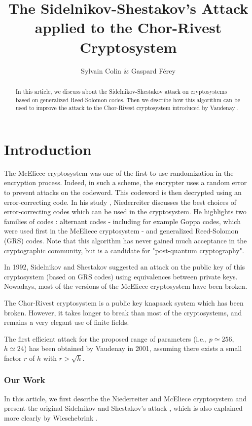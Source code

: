 \documentclass[a4paper]{article}
\author{Sylvain Colin \& Gaspard Férey}
\title{The Sidelnikov-Shestakov's Attack applied to the Chor-Rivest Cryptosystem}
\begin{document}
\maketitle

\begin{abstract}
In this article, we discuss about the Sidelnikov-Shestakov attack \cite{SidelShes92} on cryptosystems based on generalized Reed-Solomon codes. Then we describe how this algorithm can be used to improve the attack to the Chor-Rivest cryptosystem introduced by Vaudenay \cite{Vau01}.
\end{abstract}

\section{Introduction}
\label{sec:intro}

The McEliece cryptosystem \cite{NiederH86} was one of the first to use randomization in the encryption process. Indeed, in such a scheme, the encrypter uses a random error to prevent attacks on the codeword. This codeword is then decrypted using an error-correcting code. 
In his study \cite{NiederH86}, Niederreiter discusses the best choices of error-correcting codes which can be used in the cryptosystem. He highlights two families of codes : alternant codes
 - including for example Goppa codes, which were used first in the McEliece cryptosystem - and generalized Reed-Solomon (GRS) codes.
Note that this algorithm has never gained much acceptance in the cryptographic community, but is a candidate for "post-quantum cryptography".

In 1992, Sidelnikov and Shestakov suggested an attack \cite{SidelShes92} on the public key of this cryptosystem (based on GRS codes) using equivalences between private keys.
Nowadays, most of the versions of the McEliece cryptosystem have been broken.

The Chor-Rivest cryptosystem \cite{ChorRiv88} is a public key knapsack system which has been broken.  However, it takes longer to break than most of the cryptosystems, and remains a very elegant use of finite fields.

The first efficient attack for the proposed range of parameters (i.e., $p \simeq 256$, $h \simeq 24$) has been obtained by Vaudenay in 2001, assuming there exists a small factor $r$ of $h$ with $r > \sqrt{h}$.


\subsubsection*{Our Work}
In this article, we first describe the Niederreiter and McEliece cryptosystem and present the original Sidelnikov and Shestakov's attack \cite{SidelShes92}, which is also explained more clearly by Wieschebrink \cite{Wiesch}.
\end{document}
